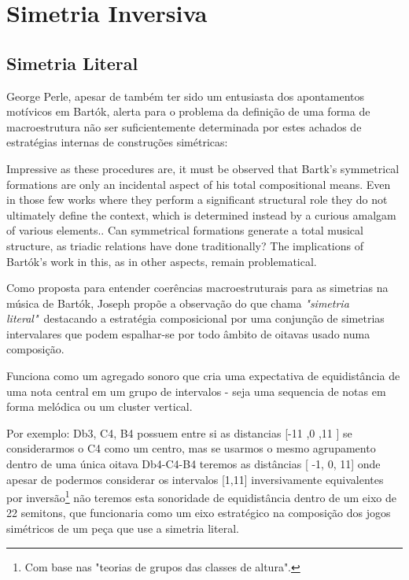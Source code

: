 \documentclass[
	12pt,				%
	openright,			%
	twoside,			%
	a4paper,			%
	english,			%
	french,				%
	spanish,			%
	brazil				%
	]{abntex2}
\begin{document}
\section{Simetria Inversiva}


\subsection{Simetria Literal}


George Perle, apesar de também ter sido um entusiasta dos apontamentos motívicos em Bartók, alerta para o problema da definição de uma forma de macroestrutura não ser suficientemente determinada por estes achados de estratégias internas de construções simétricas:

\begin{citacao}
Impressive as these procedures are, it must be observed that Bartk's symmetrical formations 
are only an incidental aspect of his total compositional means. Even in those few works where they perform a significant structural role they do not ultimately define the context, which is determined
instead by a curious amalgam of various elements..
Can symmetrical formations generate a total musical structure, as triadic relations have done traditionally? The implications of Bartók's work in this, as in other aspects, remain problematical.
\end{citacao}

Como proposta para entender coerências macroestruturais para as simetrias na música de Bartók, Joseph  propõe a observação do que chama \textit{"simetria literal"}\ destacando a estratégia composicional por uma conjunção de simetrias intervalares que podem espalhar-se por todo âmbito de oitavas usado numa composição.  

Funciona como um  agregado sonoro que cria uma expectativa de equidistância de uma nota central em um grupo de intervalos - seja uma sequencia de notas em forma melódica ou um cluster vertical. 

Por exemplo: { Db3, C4, B4} possuem entre si as distancias [-11 ,0 ,11 ] se considerarmos o C4 como um centro, mas se usarmos o mesmo agrupamento dentro de uma única oitava {Db4-C4-B4} teremos as distâncias [ -1, 0, 11] onde apesar de podermos considerar os intervalos [1,11] inversivamente equivalentes por inversão\footnote{Com base nas "teorias de grupos das classes de altura".} não teremos esta sonoridade de equidistância dentro de um eixo de 22 semitons, que funcionaria como um eixo estratégico na composição dos jogos simétricos de um peça que use a simetria literal. 
\end{document}
